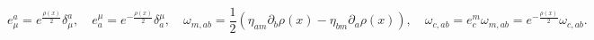 \begin{equation}
e_\mu^a = e^{\frac{\rho(x)}{2}} \delta^a_\mu, \quad
 e_a^\mu  = e^{- \frac{\rho(x)}{2}} \delta^\mu_a,
\quad \omega_{m, ab}= \frac{1}{2} (\eta_{a m}  \partial_b \rho(x)
- \eta_{b m}  \partial_a \rho(x)), \quad \omega_{c, ab} = e^m_c
\omega_{m, ab} = e^{-\frac{\rho(x)}{2}} \omega_{c, ab}.
\end{equation}

